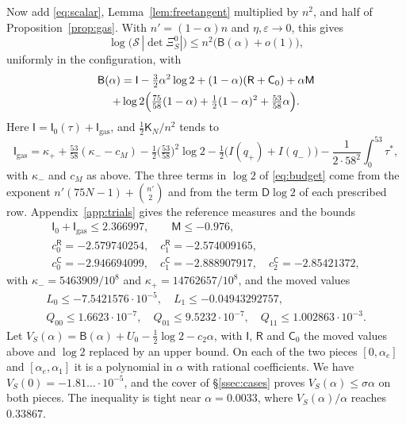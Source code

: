 \documentclass[11pt]{amsart}
\theoremstyle{definition}
\theoremstyle{remark}
\numberwithin{equation}{section}
\begin{document}
Now add \eqref{eq:scalar}, Lemma~\ref{lem:freetangent} multiplied by $n^2$, and half of Proposition~\ref{prop:gas}. With $n'=(1-\alpha)n$ and $\eta,\varepsilon\to0$, this gives
\[
 \log\bigl(\mathcal S\,|\det\Xi^0_S|\bigr)\le n^2\bigl(\mathsf B(\alpha)+o(1)\bigr),
\]
uniformly in the configuration, with
\begin{multline}\label{eq:budget}
 \mathsf B(\alpha)=\mathsf I-\tfrac32\alpha^2\log2+(1-\alpha)(\mathsf R+\mathsf C_0)+\alpha\mathsf M\\
 +\log2\Bigl(\tfrac{75}{58}(1-\alpha)+\tfrac12(1-\alpha)^2+\tfrac{53}{58}\alpha\Bigr).
\end{multline}
Here $\mathsf I=\mathsf I_0(\tau)+\mathsf I_{\mathrm{gas}}$, and $\frac12\mathsf K_N/n^2$ tends to
\[
 \mathsf I_{\mathrm{gas}}=\kappa_++\tfrac{53}{58}(\kappa_--c_M)-\tfrac12\bigl(\tfrac{53}{58}\bigr)^2\log2-\tfrac12\bigl(I(q_+)+I(q_-)\bigr)-\frac1{2\cdot58^2}\int_0^{53}\tau^*,
\]
with $\kappa_-$ and $c_M$ as above. The three terms in $\log2$ of \eqref{eq:budget} come from the exponent
$n'(75N-1)+\binom{n'}2$ and from the term $\mathsf D\log2$ of each prescribed row. Appendix~\ref{app:trials} gives the reference measures and the bounds
\begin{equation}\label{eq:caps}
\begin{gathered}
 \mathsf I_0+\mathsf I_{\mathrm{gas}}\le2.366997,\qquad\mathsf M\le-0.976,\\
 c^{\mathsf R}_0=-2.579740254,\quad c^{\mathsf R}_1=-2.574009165,\\
 c^{\mathsf C}_0=-2.946694099,\quad c^{\mathsf C}_1=-2.888907917,\quad c^{\mathsf C}_2=-2.85421372,
\end{gathered}
\end{equation}
with $\kappa_-=5463909/10^8$ and $\kappa_+=14762657/10^8$, and the moved values
\begin{gather*}
 L_0\le-7.5421576\cdot10^{-5},\quad L_1\le-0.04943292757,\\
 Q_{00}\le1.6623\cdot10^{-7},\quad Q_{01}\le9.5232\cdot10^{-7},\quad Q_{11}\le1.002863\cdot10^{-3}.
\end{gather*}
Let $V_S(\alpha)=\mathsf B(\alpha)+U_0-\frac12\log2-c_2\alpha$, with $\mathsf I$, $\mathsf R$ and $\mathsf C_0$ the moved values above and $\log2$
replaced by an upper bound. On each of the two pieces $[0,\alpha_e]$ and $[\alpha_e,\alpha_1]$ it is a polynomial in $\alpha$ with rational
coefficients. We have $V_S(0)=-1.81\ldots\cdot10^{-5}$, and the cover of \S\ref{ssec:cases} proves $V_S(\alpha)\le\sigma\alpha$ on both pieces. The
inequality is tight near $\alpha=0.0033$, where $V_S(\alpha)/\alpha$ reaches $0.33867$.
\end{document}
